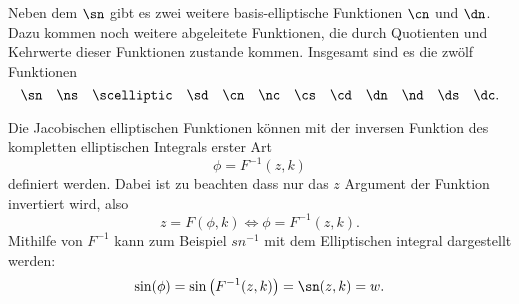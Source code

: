 Neben dem $\sn$ gibt es zwei weitere basis-elliptische Funktionen $\cn$ und $\dn$.
Dazu kommen noch weitere abgeleitete Funktionen, die durch Quotienten und Kehrwerte dieser Funktionen zustande kommen.
Insgesamt sind es die zwölf Funktionen
\begin{equation*}
    \sn \quad
    \ns \quad
    \scelliptic \quad
    \sd \quad
    \cn \quad
    \nc \quad
    \cs \quad
    \cd \quad
    \dn \quad
    \nd \quad
    \ds \quad
    \dc.
\end{equation*}

Die Jacobischen elliptischen Funktionen können mit der inversen Funktion des kompletten elliptischen Integrals erster Art
\begin{equation}
    \phi = F^{-1}(z, k)
\end{equation}
definiert werden. Dabei ist zu beachten dass nur das $z$ Argument der Funktion invertiert wird, also
\begin{equation}
    z = F(\phi, k)
    \Leftrightarrow
    \phi = F^{-1}(z, k).
\end{equation}
Mithilfe von $F^{-1}$ kann zum Beispiel $sn^{-1}$ mit dem Elliptischen integral dargestellt werden:
\begin{equation}
    \sin(\phi)
    =
    \sin \left( F^{-1}(z, k) \right)
    =
    \sn(z, k)
    =
    w.
\end{equation}





